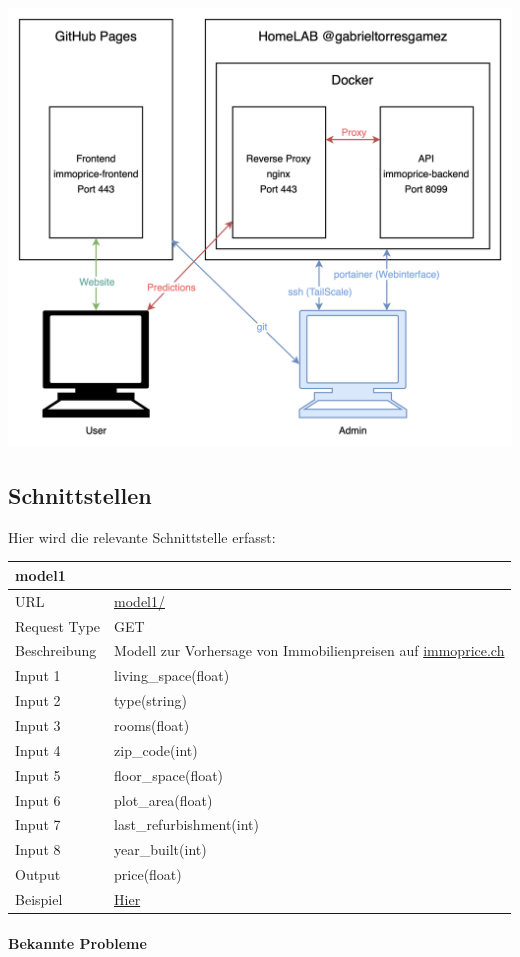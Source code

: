 \documentclass[a4paper, 12pt]{article}
\begin{document}
\includegraphics[width=\linewidth]{img/SetupDocker.png}

\newpage
\hypertarget{schnittstellen}{%
\subsection{Schnittstellen}\label{schnittstellen}}

Hier wird die relevante Schnittstelle erfasst:

\begin{longtable}[]{@{}ll@{}}
\toprule
model1 &\tabularnewline
\midrule
\endhead
URL & \href{https://api.immoprice.ch/model1/}{model1/}\tabularnewline
Request Type & GET\tabularnewline
Beschreibung & Modell zur Vorhersage von Immobilienpreisen auf
\href{https://immoprice.ch}{immoprice.ch}\tabularnewline
Input 1 & living\_space(float)\tabularnewline
Input 2 & type(string)\tabularnewline
Input 3 & rooms(float)\tabularnewline
Input 4 & zip\_code(int)\tabularnewline
Input 5 & floor\_space(float)\tabularnewline
Input 6 & plot\_area(float)\tabularnewline
Input 7 & last\_refurbishment(int)\tabularnewline
Input 8 & year\_built(int)\tabularnewline
Output & price(float)\tabularnewline
Beispiel &
\href{https://api.immoprice.ch/model1/?living_space=200\&type=villa\&rooms=10\&zip_code=8050\&floor_space=300\&plot_area=500\&last_refurbishment=2020\&year_built=2010}{Hier}\tabularnewline
\bottomrule
\end{longtable}

\hypertarget{bekannte-probleme}{%
\paragraph{Bekannte Probleme}\label{bekannte-probleme}}
\end{document}
